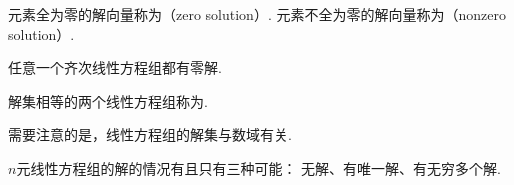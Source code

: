 \begin{definition}
元素全为零的解向量称为（zero solution）.
元素不全为零的解向量称为（nonzero solution）.
\end{definition}

\begin{theorem}
任意一个齐次线性方程组都有零解.
\end{theorem}

\begin{definition}
解集相等的两个线性方程组称为.
\end{definition}

需要注意的是，线性方程组的解集与数域有关.

\begin{theorem}
\(n\)元线性方程组的解的情况有且只有三种可能：
无解、有唯一解、有无穷多个解.
\end{theorem}

